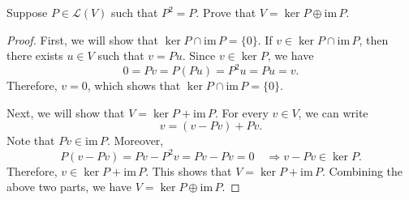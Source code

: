\documentclass{article}
\newcommand{\im}{\text{im}\,}
\begin{document}
\begin{problem}[3B-27]
    Suppose \( P\in\mathcal{L}(V) \) such that \( P^2=P \). Prove that \( V=\ker P\oplus\im P  \).
\end{problem}

\begin{proof}
    First, we will show that \( \ker P \cap \im P = \{0\} \). If \( v \in \ker P \cap \im P \), then there exists \( u \in V \) such that \( v = Pu \). Since \( v \in \ker P \), we have
    \[ 0 = Pv = P(Pu) = P^2 u = Pu = v. \]
    Therefore, \( v = 0 \), which shows that \( \ker P \cap \im P = \{0\} \). \par
    Next, we will show that \( V = \ker P + \im P \). For every \( v \in V \), we can write
    \[ v = (v - Pv) + Pv. \]
    Note that \( Pv \in \im P \). Moreover, 
    \[ P(v-Pv)=Pv-P^2v=Pv-Pv=0\quad\Rightarrow v-Pv\in\ker P. \] 
    Therefore, \( v\in\ker P +\im P  \). This shows that \( V = \ker P +\im P  \). Combining the above two parts, we have \( V=\ker P\oplus\im P  \).
\end{proof}
\end{document}
